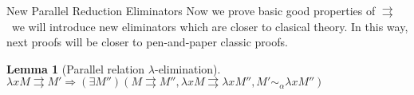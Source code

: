 \documentclass[ignorenonframetext]{beamer}
\newcommand{\alpsym}{\ensuremath{\sim_\alpha}}
\newcommand{\p}{\ensuremath{\rightrightarrows}}
\newcommand{\lam}{\ensuremath{\lambda}}
\newtheorem{lem}{Lemma}
\begin{document}
\begin{frame}{New Parallel Reduction Eliminators}
 Now we prove basic good properties of \p\ we will introduce new eliminators which are closer to clasical theory. In this way, next proofs will be closer to pen-and-paper classic proofs.

\vspace{4mm}

\begin{lem}[Parallel relation \lam-elimination]
\label{lamelim}
$ \lam x M \p M' \Rightarrow (\exists M'')(M \p M'' , \lam x M \p \lam x M'' , M' \alpsym \lam x M'') $
\end{lem}

\begin{center}

\begin{minipage}{0.4\textwidth}
\end{minipage}
\begin{minipage}{0.4\textwidth}
\end{minipage}
\end{center}
\end{frame}
\end{document}
